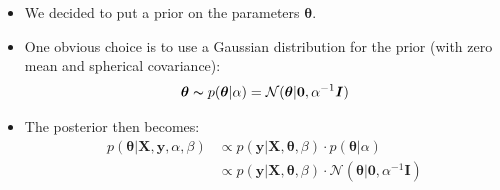 \begin{frame}
	\begin{itemize}
		\item We decided to put a prior on the parameters $\bm{\theta}$.
		\item One obvious choice is to use a Gaussian distribution for the prior (with zero mean and spherical covariance):
		\begin{equation}
			\bm{\theta} \thicksim p(\bm{\theta} \vert \alpha) = \mathcal{N}(\bm{\theta} \vert \bm{0}, \alpha^{-1} \bm{I})
		\end{equation}
		\item The posterior then becomes:
		\begin{align}
			\nonumber
			p(\bm{\theta} \vert \bm{X}, \bm{y}, \alpha, \beta)
				&\propto p(\bm{y} \vert \bm{X}, \bm{\theta}, \beta) \cdot p(\bm{\theta} \vert \alpha) \\
				&\propto p(\bm{y} \vert \bm{X}, \bm{\theta}, \beta) \cdot \mathcal{N}(\bm{\theta} \vert \bm{0}, \alpha^{-1} \bm{I}) 
		\end{align}
	\end{itemize}
\end{frame}


